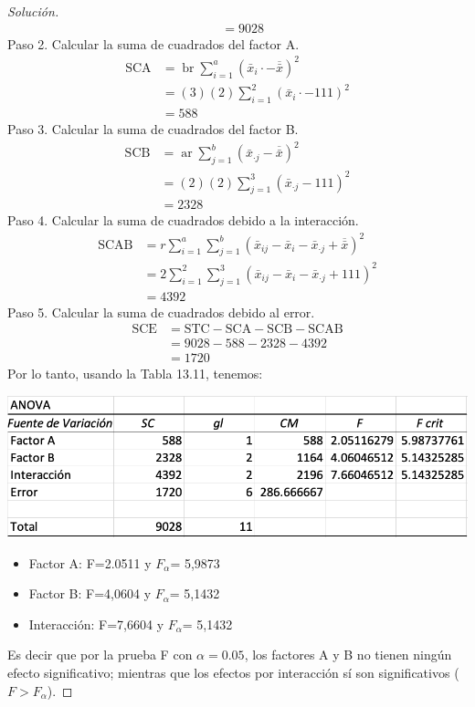 \documentclass[a4paper,12pt]{article}
\newenvironment{solution}
  {\renewcommand\qedsymbol{$\blacksquare$}\begin{proof}[Solución]}
  {\end{proof}}
\begin{document}
\begin{solution}
\begin{align}
    &=9028
\end{align}
Paso 2. Calcular la suma de cuadrados del factor A.
\begin{align}
\mathrm{SCA}&=\operatorname{br} \sum_{i=1}^{a}\left(\bar{x}_{i} \cdot-\overline{\bar{x}}\right)^{2}\\
            &=(3)(2) \sum_{i=1}^{2}\left(\bar{x}_{i} \cdot-111\right)^{2}\\
            &= 588 
\end{align}
Paso 3. Calcular la suma de cuadrados del factor B.
\begin{align}
\mathrm{SCB}&=\operatorname{ar} \sum_{j=1}^{b}\left(\bar{x}_{\cdot j}-\overline{\bar{x}}\right)^{2}\\
            &= (2)(2)\sum_{j=1}^{3}\left(\bar{x}_{\cdot j}-111\right)^{2}\\
            &= 2328
\end{align}
Paso 4. Calcular la suma de cuadrados debido a la interacción.
\begin{align}
\mathrm{SCAB}&=r \sum_{i=1}^{a} \sum_{j=1}^{b}\left(\bar{x}_{i j}-\bar{x}_{i}-\bar{x}_{\cdot j}+\overline{\bar{x}}\right)^{2}\\
 &= 2 \sum_{i=1}^{2} \sum_{j=1}^{3}\left(\bar{x}_{i j}-\bar{x}_{i}-\bar{x}_{\cdot j}+111\right)^{2}\\
 &= 4392
\end{align}
Paso 5. Calcular la suma de cuadrados debido al error.
\begin{align}
\mathrm{SCE}&=\mathrm{STC}-\mathrm{SCA}-\mathrm{SCB}-\mathrm{SCAB}\\
            &= 9028-588-2328-4392\\
            &= 1720
\end{align}
Por lo tanto, usando la Tabla 13.11, tenemos:
\begin{center}
    \includegraphics[scale=0.5]{Images/28-ANOVA.png}
\end{center}
\begin{itemize}
    \item Factor A: F=2.0511 y $F_\alpha$= 5,9873
    \item Factor B: F=4,0604 y $F_\alpha$= 5,1432
    \item Interacción: F=7,6604 y $F_\alpha$= 5,1432
\end{itemize}
Es decir que por la prueba F con $\alpha=0.05$, los factores A y B no tienen ningún efecto significativo; mientras que los efectos por interacción sí son significativos ($F>F_\alpha$).
\end{solution}
\end{document}
